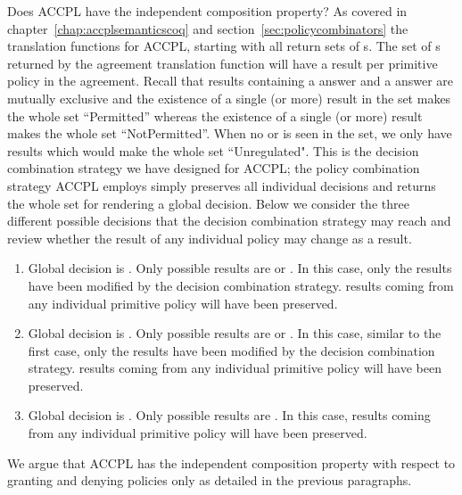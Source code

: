 Does \ac{ACCPL} have the independent composition property? As covered in chapter~\ref{chap:accplsemanticscoq} and section~\ref{sec:policycombinators} the translation functions for \ac{ACCPL}, starting with  all return sets of s.  The set of s returned by the agreement translation function will have a result per primitive policy in the agreement. Recall that results containing a  answer and a  answer are mutually exclusive and the existence of a single (or more)  result in the set makes the whole set ``Permitted'' whereas the existence of a single (or more)  result makes the whole set ``NotPermitted''. When no  or  is seen in the set, we only have  results which would make the whole set ``Unregulated". This is the decision combination strategy we have designed for \ac{ACCPL}; the policy combination strategy \ac{ACCPL} employs simply preserves all individual decisions and returns the whole set for rendering a global decision. Below we consider the three different possible decisions that the decision combination strategy may reach and review whether the result of any individual policy may change as a result.

\begin{enumerate}
  \item Global decision is . Only possible results are  or . In this case, only the  results have been modified by the decision combination strategy.  results coming from any individual primitive policy will have been preserved.
  \item Global decision is . Only possible results are  or . In this case, similar to the first case, only the  results have been modified by the decision combination strategy.  results coming from any individual primitive policy will have been preserved.
   \item Global decision is . Only possible results are .  In this case, results coming from any individual primitive policy will have been preserved.
\end{enumerate}

We argue that \ac{ACCPL} has the independent composition property with respect to granting and denying policies only as detailed in the previous paragraphs. 

